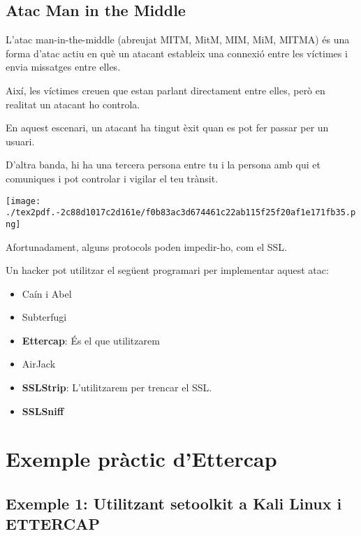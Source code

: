 \documentclass[]{article}
\begin{document}
\hypertarget{atac-man-in-the-middle}{%
\subsection{\texorpdfstring{\textbf{Atac Man in the
Middle}}{Atac Man in the Middle}}\label{atac-man-in-the-middle}}

L'atac man-in-the-middle (abreujat MITM, MitM, MIM, MiM, MITMA) és una
forma d'atac actiu en què un atacant estableix una connexió entre les
víctimes i envia missatges entre elles.

Així, les víctimes creuen que estan parlant directament entre elles,
però en realitat un atacant ho controla.

En aquest escenari, un atacant ha tingut èxit quan es pot fer passar per
un usuari.

D'altra banda, hi ha una tercera persona entre tu i la persona amb qui
et comuniques i pot controlar i vigilar el teu trànsit.

\texttt{[image: ./tex2pdf.-2c88d1017c2d161e/f0b83ac3d674461c22ab115f25f20af1e171fb35.png]}

Afortunadament, alguns protocols poden impedir-ho, com el SSL.

Un hacker pot utilitzar el següent programari per implementar aquest
atac:

\begin{itemize}
\item
  Caín i Abel
\item
  Subterfugi
\item
  \textbf{Ettercap}: És el que utilitzarem
\item
  AirJack
\item
  \textbf{SSLStrip}: L'utilitzarem per trencar el SSL.
\item
  \textbf{SSLSniff}
\end{itemize}

\hypertarget{exemple-pruxe0ctic-dettercap}{%
\section{\texorpdfstring{\textbf{Exemple pràctic
d'Ettercap}}{Exemple pràctic d'Ettercap}}\label{exemple-pruxe0ctic-dettercap}}

\hypertarget{exemple-1-utilitzant-setoolkit-a-kali-linux-i-ettercap}{%
\subsection{\texorpdfstring{\textbf{Exemple 1: Utilitzant
\textbf{setoolkit} a Kali Linux i
ETTERCAP}}{Exemple 1: Utilitzant setoolkit a Kali Linux i ETTERCAP}}\label{exemple-1-utilitzant-setoolkit-a-kali-linux-i-ettercap}}
\end{document}
